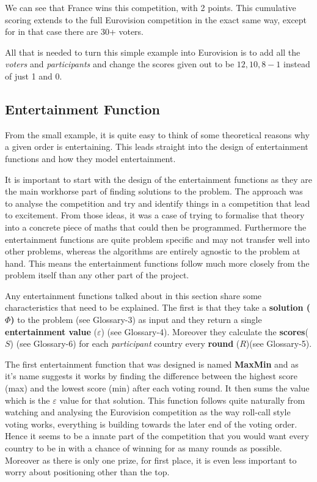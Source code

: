 \documentclass[12pt]{report}
\begin{document}
We can see that France wins this competition, with 2 points. This cumulative scoring extends to the full Eurovision competition in the exact same way, except for in that case there are 30+ voters.

All that is needed to turn this simple example into Eurovision is to add all the \textit{voters} and \textit{participants} and change the scores given out to be $12, 10, 8-1$ instead of just 1 and 0.

\subsection{Entertainment Function}\label{EntertainmentFunction}
From the small example, it is quite easy to think of some theoretical reasons why a given order is entertaining. This leads straight into the design of entertainment functions and how they model entertainment. 

It is important to start with the design of the entertainment functions as they are the main workhorse part of finding solutions to the problem. The approach was to analyse the competition and try and identify things in a competition that lead to excitement. From those ideas, it was a case of trying to formalise that theory into a concrete piece of maths that could then be programmed. Furthermore the entertainment functions are quite problem specific and may not transfer well into other problems, whereas the algorithms are entirely agnostic to the problem at hand. This means the entertainment functions follow much more closely from the problem itself than any other part of the project.

Any entertainment functions talked about in this section share some characteristics that need to be explained. The first is that they take a \textbf{solution ($\Phi$)} to the problem (see Glossary-3) as input and they return a single \textbf{entertainment value} ($\varepsilon$) (see Glossary-4). Moreover they calculate the \textbf{scores}($S$) (see Glossary-6) for each \textit{participant} country every \textbf{round} ($R$)(see Glossary-5).

The first entertainment function that was designed is named \textbf{MaxMin} and as it's name suggests it works by finding the difference between the highest score (max) and the lowest score (min) after each voting round. It then sums the value which is the $\varepsilon$ value for that solution. This function follows quite naturally from watching and analysing the Eurovision competition as the way roll-call style voting works, everything is building towards the later end of the voting order. Hence it seems to be a innate part of the competition that you would want every country to be in with a chance of winning for as many rounds as possible. Moreover as there is only one prize, for first place, it is even less important to worry about positioning other than the top.
\end{document}
